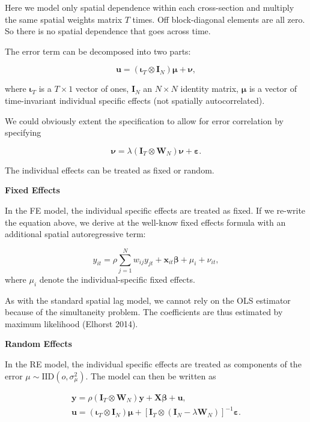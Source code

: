 \documentclass[
  letterpaper,
  DIV=11,
  numbers=noendperiod]{scrreprt}
\begin{document}
Here we model only spatial dependence within each cross-section and
multiply the same spatial weights matrix \(T\) times. Off block-diagonal
elements are all zero. So there is no spatial dependence that goes
across time.

The error term can be decomposed into two parts:

\[
        {\boldsymbol{\mathbf{u}}}= (\boldsymbol{\mathbf{\iota}}_T \otimes {\boldsymbol{\mathbf{I}}_N})\boldsymbol{\mathbf{\mu}}+ {\boldsymbol{\mathbf{\nu}}},
\]

where \(\boldsymbol{\mathbf{\iota}}_T\) is a \(T \times 1\) vector of
ones, \({\boldsymbol{\mathbf{I}}_N}\) an \(N \times N\) identity matrix,
\(\boldsymbol{\mathbf{\mu}}\) is a vector of time-invariant individual
specific effects (not spatially autocorrelated).

We could obviously extent the specification to allow for error
correlation by specifying

\[
        {\boldsymbol{\mathbf{\nu}}}= \lambda(\boldsymbol{\mathbf{I}}_T \otimes {\boldsymbol{\mathbf{W}}_N})\boldsymbol{\mathbf{\nu }}+ {\boldsymbol{\mathbf{\varepsilon}}}.
\]

The individual effects can be treated as fixed or random.

\textbf{Fixed Effects}

In the FE model, the individual specific effects are treated as fixed.
If we re-write the equation above, we derive at the well-know fixed
effects formula with an additional spatial autoregressive term:

\[
        {y_{it}}= \rho\sum_{j=1}^Nw_{ij}y_{jt} + \boldsymbol{\mathbf{x}}_{it}\boldsymbol{\mathbf{\beta }}+ \mu_i + \nu_{it},
\] where \(\mu_i\) denote the individual-specific fixed effects.

As with the standard spatial lag model, we cannot rely on the OLS
estimator because of the simultaneity problem. The coefficients are thus
estimated by maximum likelihood (Elhorst 2014).

\textbf{Random Effects}

In the RE model, the individual specific effects are treated as
components of the error \(\mu \sim \mathrm{IID}(o, \sigma_\mu^2)\). The
model can then be written as

\[
\begin{split}
        {\boldsymbol{\mathbf{y}}}= \rho(\boldsymbol{\mathbf{I}}_T\otimes {\boldsymbol{\mathbf{W}}_N}){\boldsymbol{\mathbf{y}}}+{\boldsymbol{\mathbf{X}}}{\boldsymbol{\mathbf{\beta}}}+ {\boldsymbol{\mathbf{u}}}, \\
        {\boldsymbol{\mathbf{u}}}= (\boldsymbol{\mathbf{\iota}}_T \otimes {\boldsymbol{\mathbf{I}}_N})\boldsymbol{\mathbf{\mu}}+ [\boldsymbol{\mathbf{I}}_T \otimes (\boldsymbol{\mathbf{I}}_N -  \lambda{\boldsymbol{\mathbf{W}}_N})]^{-1} {\boldsymbol{\mathbf{\varepsilon}}}.
\end{split}     
\]
\end{document}

